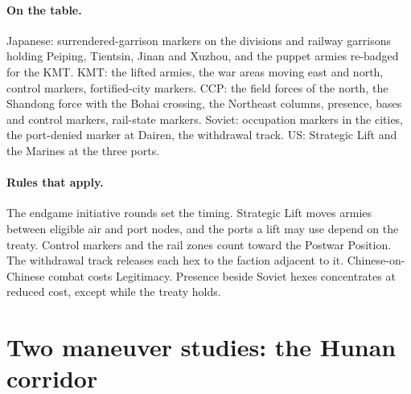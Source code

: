 \documentclass[11pt]{article}
\begin{document}
\paragraph{On the table.} Japanese: surrendered-garrison markers on the divisions and railway garrisons holding Peiping, Tientsin, Jinan and Xuzhou, and the puppet armies re-badged for the KMT. KMT: the lifted armies, the war areas moving east and north, control markers, fortified-city markers. CCP: the field forces of the north, the Shandong force with the Bohai crossing, the Northeast columns, presence, bases and control markers, rail-state markers. Soviet: occupation markers in the cities, the port-denied marker at Dairen, the withdrawal track. US: Strategic Lift and the Marines at the three ports.
\paragraph{Rules that apply.} The endgame initiative rounds set the timing. Strategic Lift moves armies between eligible air and port nodes, and the ports a lift may use depend on the treaty. Control markers and the rail zones count toward the Postwar Position. The withdrawal track releases each hex to the faction adjacent to it. Chinese-on-Chinese combat costs Legitimacy. Presence beside Soviet hexes concentrates at reduced cost, except while the treaty holds.
\clearpage

\section{Two maneuver studies: the Hunan corridor}\label{sec:maneuvers}

\end{document}
